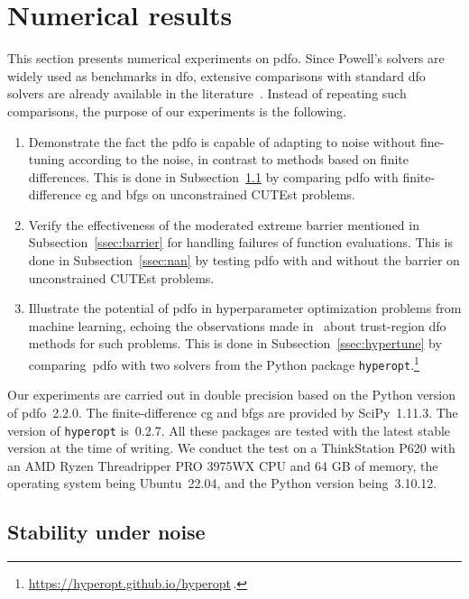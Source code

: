 \documentclass{article}
\numberwithin{equation}{section}
\theoremstyle{definition}
\theoremstyle{plain}
\theoremstyle{remark}
\begin{document}
\section{Numerical results}
\label{sec:numerical}

This section presents numerical experiments on \gls{pdfo}.
Since Powell's solvers are widely used as benchmarks in \gls{dfo}, extensive comparisons with standard \gls{dfo} solvers are already available in the literature~\cite{More_Wild_2009,Rios_Sahinidis_2013}.
Instead of repeating such comparisons, the purpose of our experiments is the following.
\begin{enumerate}
    \item Demonstrate the fact the \gls{pdfo} is capable of adapting to noise without fine-tuning according to the noise, in contrast to methods based on finite differences.
        This is done in Subsection~\ref{ssec:noise} by comparing \gls{pdfo} with finite-difference \gls{cg} and \gls{bfgs} on unconstrained CUTEst problems.
    \item Verify the effectiveness of the moderated extreme barrier mentioned in Subsection~\ref{ssec:barrier} for handling failures of function evaluations.
        This is done in Subsection~\ref{ssec:nan} by testing \gls{pdfo} with and without the barrier on unconstrained CUTEst problems.
    \item Illustrate the potential of \gls{pdfo} in hyperparameter optimization problems from machine learning, echoing the observations made in~\cite{Ghanbari_Scheinberg_2017} about trust-region \gls{dfo} methods for such problems.
        This is done in Subsection~\ref{ssec:hypertune} by comparing~\gls{pdfo} with two solvers from the Python package \texttt{hyperopt}.\footnote{\url{https://hyperopt.github.io/hyperopt}\,.}
\end{enumerate}

Our experiments are carried out in double precision based on the Python version of \gls{pdfo}~2.2.0.
The finite-difference \gls{cg} and \gls{bfgs} are provided by SciPy~1.11.3.
The version of \texttt{hyperopt} is~0.2.7.
All these packages are tested with the latest stable version at the time of writing.
We conduct the test on a ThinkStation P620 with an AMD Ryzen Threadripper PRO 3975WX CPU and 64 GB of memory, the operating system being Ubuntu~22.04, and the Python version being~3.10.12.

\subsection{Stability under noise}
\label{ssec:noise}
\end{document}
